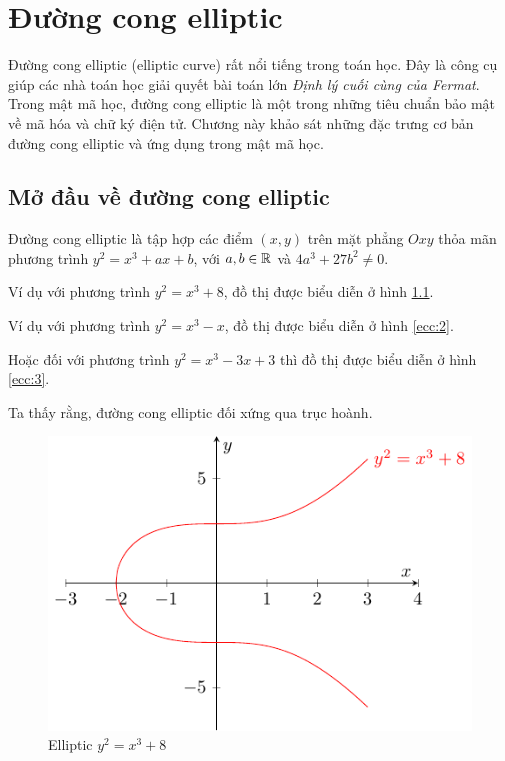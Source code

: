 \chapter{Đường cong elliptic}

Đường cong elliptic (elliptic curve) rất nổi tiếng trong toán học. Đây là
công cụ giúp các nhà toán học giải quyết bài toán lớn \textit{Định lý 
cuối cùng của Fermat}. Trong mật mã học, đường cong elliptic là một
trong những tiêu chuẩn bảo mật về mã hóa và chữ ký điện tử. Chương này 
khảo sát những đặc trưng cơ bản đường cong elliptic và ứng dụng trong
mật mã học.

\section{Mở đầu về đường cong elliptic}

Đường cong elliptic là tập hợp các điểm $(x, y)$ trên mặt phẳng $Oxy$
thỏa mãn phương trình $y^2 = x^3 + ax + b$, với $a, b \in \mathbb{R}$ và
$4a^3 + 27b^2 \neq 0$.

Ví dụ với phương trình $y^2 = x^3 + 8$, đồ thị được biểu diễn 
ở hình \ref{ecc:1}.

Ví dụ với phương trình $y^2 = x^3 - x$, đồ thị được biểu diễn
ở hình \ref{ecc:2}.

Hoặc đối với phương trình $y^2 = x^3 - 3x + 3$ thì đồ thị được biểu diễn
ở hình \ref{ecc:3}.

Ta thấy rằng, đường cong elliptic đối xứng qua trục hoành.

\begin{figure}[ht]
    \centering
    \includegraphics{Elliptic/ecc1.pdf}
    \caption{Elliptic $y^2 = x^3 + 8$}
    \label{ecc:1}
\end{figure}

